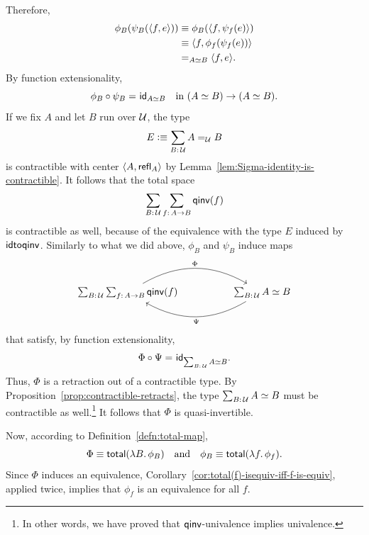 \begin{solution}
\begin{enumerate}[a)]
        Therefore,
        \begin{align*}
            \phi_B(\psi_B(\langle f,e\rangle))
                &\equiv\phi_B(\langle f,\psi_f(e)\rangle)\\
                &\equiv\langle f,\phi_f(\psi_f(e))\rangle\\
                &\mathrel{=_{A\simeq B}}\langle f,e\rangle.
        \end{align*}
        By function extensionality,
        \[
            \phi_B\circ\psi_B\mathrel{=_{}}\mathsf{id}_{A\simeq B}
                \quad\text{in }(A\simeq B)\to(A\simeq B).
        \]
        If we fix $A$ and let $B$ run over $\mathcal U$, the type
        \[
            E\defeq\sum_{B\colon\univ}A\eq\univ B
        \]
        is contractible with center $\langle A,\mathsf{refl}_A\rangle$ by Lemma~\ref{lem:Sigma-identity-is-contractible}. It follows that the total space
        \[
            \sum_{B\colon\univ}\sum_{f\colon A\to B}\fun{qinv}(f)
        \]
        is contractible as well, because of the equivalence with the type $E$ induced by $\mathsf{idtoqinv}$. Similarly to what we did above, $\phi_B$ and $\psi_B$ induce maps
        \[
            \begin{tikzcd}[column sep=huge]
                \sum_{B\colon\univ}\sum_{f\colon A\to B}\fun{qinv}(f)
                        \arrow[r,"\Phi",bend left]
                    &\sum_{B\colon\univ}A\simeq B
                        \arrow[l,"\Psi",bend left]
            \end{tikzcd}
        \]
        that satisfy, by function extensionality,
        \[
            \Phi\circ\Psi\eq{}\id_{\sum_{B\colon\univ}A\simeq B}.
        \]
        Thus, $\Phi$ is a retraction out of a contractible type. By Proposition~\ref{prop:contractible-retracts}, the type $\sum_{B\colon\univ}A\simeq B$ must be contractible as well.\footnote{In other words, we have proved that $\mathsf{qinv}$-univalence implies univalence.} It follows that $\Phi$ is quasi-invertible.
        
        Now, according to Definition~\ref{defn:total-map},
        \[
            \Phi\equiv\mathsf{total}(\lambda B.\,\phi_B)
            \quad\text{and}\quad
            \phi_B\equiv\mathsf{total}(\lambda f.\,\phi_f).
        \]
        Since $\Phi$ induces an equivalence, Corollary~\ref{cor:total(f)-isequiv-iff-f-is-equiv}, applied twice, implies that $\phi_f$ is an equivalence for all $f$.


\end{enumerate}
\end{solution}

